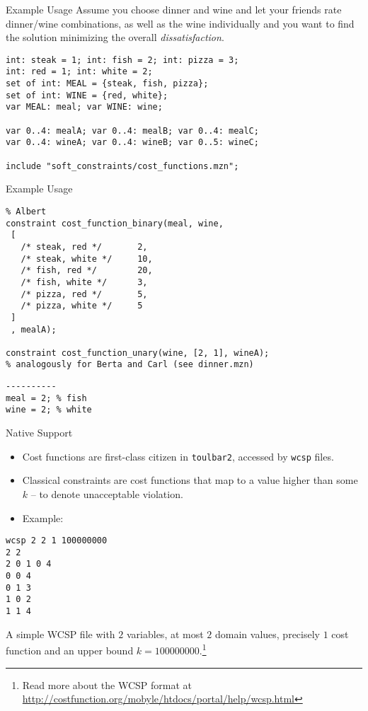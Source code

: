 \documentclass[handout,10pt,xcolor={dvipsnames},fleqn]{beamer}
\begin{document}
\begin{frame}[fragile]{Example Usage}
Assume you choose dinner and wine and let your friends 
rate dinner/wine combinations, as well as the wine individually
and you want to find the solution minimizing the overall \emph{dissatisfaction}.

\begin{lstlisting}
int: steak = 1; int: fish = 2; int: pizza = 3;
int: red = 1; int: white = 2;
set of int: MEAL = {steak, fish, pizza};
set of int: WINE = {red, white};
var MEAL: meal; var WINE: wine; 

var 0..4: mealA; var 0..4: mealB; var 0..4: mealC;
var 0..4: wineA; var 0..4: wineB; var 0..5: wineC;

include "soft_constraints/cost_functions.mzn";
\end{lstlisting}
%
\end{frame}

\begin{frame}[fragile]{Example Usage}

\begin{lstlisting}
% Albert
constraint cost_function_binary(meal, wine, 
 [
   /* steak, red */       2,
   /* steak, white */     10,
   /* fish, red */        20,
   /* fish, white */      3,
   /* pizza, red */       5,
   /* pizza, white */     5
 ]
 , mealA);

constraint cost_function_unary(wine, [2, 1], wineA);
% analogously for Berta and Carl (see dinner.mzn)
\end{lstlisting}

\begin{verbatim}
----------
meal = 2; % fish
wine = 2; % white
\end{verbatim}
\end{frame}

\begin{frame}[fragile]{Native Support}
\begin{itemize}
\item Cost functions are \alert{first-class citizen} in \texttt{toulbar2}, accessed by \texttt{wcsp} files.
\item Classical constraints are cost functions that map to a value higher than some $k$ -- to denote unacceptable violation. 
\item Example:
\end{itemize}
\small
\begin{verbatim}
wcsp 2 2 1 100000000
2 2
2 0 1 0 4
0 0 4
0 1 3
1 0 2
1 1 4
\end{verbatim}
A simple WCSP file with $2$ variables, at most $2$ domain values, precisely $1$ cost function and an upper bound $k = 100000000$.\footnote{Read more about the WCSP format at \url{http://costfunction.org/mobyle/htdocs/portal/help/wcsp.html}} 
\end{frame}
\end{document}
